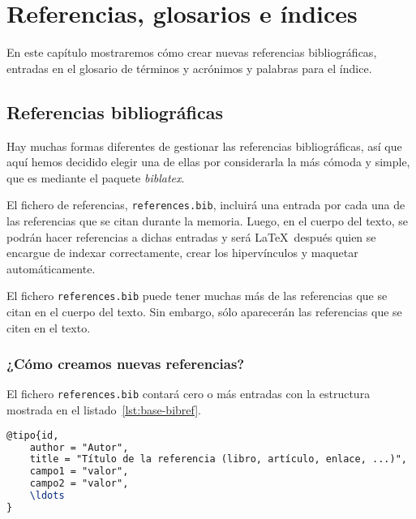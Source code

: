 \chapter{Referencias, glosarios e índices}
\label{ch:referencias}

En este capítulo mostraremos cómo crear nuevas referencias bibliográficas, entradas en el glosario de términos y acrónimos y palabras para el índice.

\section{Referencias bibliográficas}
\label{s:referencias-bibliograficas}

Hay muchas formas diferentes de gestionar las referencias bibliográficas, así que aquí hemos decidido elegir una de ellas por considerarla la más cómoda y simple, que es mediante el paquete \textit{biblatex}.

El fichero de referencias, \texttt{references.bib}, incluirá una entrada por cada una de las referencias que se citan durante la memoria. Luego, en el cuerpo del texto, se podrán hacer referencias a dichas entradas y será \LaTeX~después quien se encargue de indexar correctamente, crear los hipervínculos y maquetar automáticamente.

El fichero \texttt{references.bib} puede tener muchas más de las referencias que se citan en el cuerpo del texto. Sin embargo, sólo aparecerán las referencias que se citen en el texto.

 
\subsection{¿Cómo creamos nuevas referencias?}

El fichero \texttt{references.bib} contará cero o más entradas con la estructura mostrada en el listado~\ref{lst:base-bibref}.

\begin{lstlisting}[language=tex,caption=Estructura general de una referencia]
@tipo{id,
    author = "Autor",
    title = "Título de la referencia (libro, artículo, enlace, ...)",
    campo1 = "valor",
    campo2 = "valor",
    \ldots
}
\end{lstlisting}


